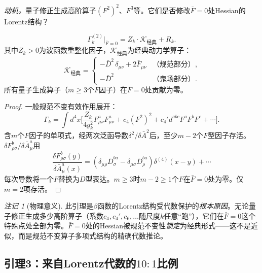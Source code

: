\documentclass[12pt,a4paper]{article}
\theoremstyle{plain}
\theoremstyle{definition}\newtheorem{definition}[theorem]{定义}
\theoremstyle{remark}\newtheorem{remark}[theorem]{注记}
\begin{document}
\textit{动机。}量子修正生成高阶算子$(F^2)^2$、$F^3$等。它们是否修改$\bar{F}=0$处Hessian的Lorentz结构？

\begin{lemma}[经典结构]\label{lem:cl}
\begin{equation}\label{eq:classical}
\Gamma_k^{(2)}\big|_{\bar{F}=0} = Z_k\cdot\mathcal{K}_{\text{经典}} + R_k.
\end{equation}
其中$Z_k>0$为波函数重整化因子，$\mathcal{K}_{\text{经典}}$为经典动力学算子：
\begin{equation}
\mathcal{K}_{\text{经典}} = \begin{cases}
-\bar{D}^2\,\delta_{\mu\nu} + 2\bar{F}_{\mu\nu} &\text{（规范部分）},\\
-\bar{D}^2 &\text{（鬼场部分）}.
\end{cases}
\end{equation}
所有量子生成算子（$m\geq 3$个$F$因子）在$\bar{F}=0$处贡献为零。
\end{lemma}

\begin{proof}
一般规范不变有效作用展开：
\begin{equation}\label{eq:Gammaexpand}
\Gamma_k = \int d^4x\Big[\frac{Z_k}{4g_k^2}F_{\mu\nu}^aF_{\mu\nu}^a + c_4(F^2)^2 + c_4'd^{abc}F^aF^bF^c + \cdots\Big].
\end{equation}
含$m$个$F$因子的单项式，经两次泛函导数$\delta^2/\delta\bar{A}^2$后，至少$m-2$个$F$型因子存活。$\delta F_{\rho\sigma}^b/\delta\bar{A}_\mu^a$用
\begin{equation}\label{eq:dFdA}
\frac{\delta F_{\rho\sigma}^b(y)}{\delta\bar{A}_\mu^a(x)} = (\delta_{\mu\rho}\bar{D}_\sigma^{ba}-\delta_{\mu\sigma}\bar{D}_\rho^{ba})\delta^{(4)}(x-y)+\cdots
\end{equation}
每次导数将一个$F$替换为$D$型表达。$m\geq 3$时$m-2\geq 1$个$F$在$\bar{F}=0$处为零。仅$m=2$项存活。
\end{proof}

\begin{remark}[物理意义]\label{rem:locking}
此引理是$\beta$函数的Lorentz结构受代数保护的\emph{根本原因}。无论量子修正生成多少高阶算子（系数$c_4,c_4',c_6,\ldots$随尺度$k$任意``跑''），它们在$\bar{F}=0$这个特殊点处全部为零。$\bar{F}=0$处的Hessian被规范不变性\emph{锁定}为经典形式——这不是近似，而是规范不变算子多项式结构的精确代数推论。
\end{remark}

\subsection{引理3：来自Lorentz代数的$10{:}1$比例}\label{sec:lemma3}
\end{document}
